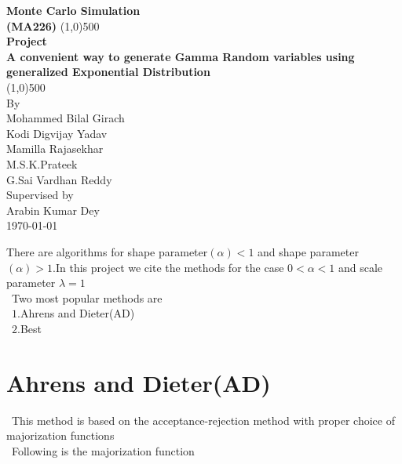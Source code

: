 \documentclass[11pt]{article}
\begin{document}
\begin{titlepage}
\begin{center}
\vspace*{1cm}
\Large{\textbf{Monte Carlo Simulation}}\\
\Large{\textbf{(MA226)}}
\vfill
\line(1,0){500}\\[1mm]
\Huge{\textbf{Project}}\\[3mm]
\Large{\textbf{A convenient way to generate Gamma Random variables using generalized Exponential Distribution}}\\[1mm]
\line(1,0){500}\\
\vfill
By \\Mohammed Bilal Girach\\
Kodi Digvijay Yadav\\
Mamilla Rajasekhar\\
M.S.K.Prateek\\
G.Sai Vardhan Reddy\\
\vspace{1cm}
Supervised by\\
Arabin Kumar Dey\\
\today
\vfill
\end{center}
\end{titlepage}
\tableofcontents
\thispagestyle{empty}
\cleardoublepage
\setcounter{page}{1}
There are algorithms for shape parameter$(\alpha)<1$ and shape parameter$(\alpha)>1$.In this project we cite the methods for the case $0<\alpha <1$ and scale parameter $\lambda=1$\\
\ Two most popular methods are \\
\ $1.$Ahrens and  Dieter(AD)\\
\ $2.$Best\\
\section{Ahrens and  Dieter(AD)}
\  This method is based on the acceptance-rejection method with proper choice of majorization functions\\
\ Following is the majorization function\\ 
\end{document}
